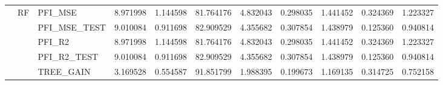 \begin{table}
\begin{tabular}{lllrrrrrrrr}
\cline{2-11}
 & \multirow[c]{8}{*}{RF} & PFI\_MSE & {\cellcolor[HTML]{5B7AE5}} \color[HTML]{F1F1F1} 8.971998 & {\cellcolor[HTML]{3D50C3}} \color[HTML]{F1F1F1} 1.144598 & {\cellcolor[HTML]{B40426}} \color[HTML]{F1F1F1} 81.764176 & {\cellcolor[HTML]{4B64D5}} \color[HTML]{F1F1F1} 4.832043 & {\cellcolor[HTML]{3B4CC0}} \color[HTML]{F1F1F1} 0.298035 & {\cellcolor[HTML]{3E51C5}} \color[HTML]{F1F1F1} 1.441452 & {\cellcolor[HTML]{3B4CC0}} \color[HTML]{F1F1F1} 0.324369 & {\cellcolor[HTML]{3D50C3}} \color[HTML]{F1F1F1} 1.223327 \\
 &  & PFI\_MSE\_TEST & {\cellcolor[HTML]{5B7AE5}} \color[HTML]{F1F1F1} 9.010084 & {\cellcolor[HTML]{3D50C3}} \color[HTML]{F1F1F1} 0.911698 & {\cellcolor[HTML]{B40426}} \color[HTML]{F1F1F1} 82.909529 & {\cellcolor[HTML]{4A63D3}} \color[HTML]{F1F1F1} 4.355682 & {\cellcolor[HTML]{3B4CC0}} \color[HTML]{F1F1F1} 0.307854 & {\cellcolor[HTML]{3F53C6}} \color[HTML]{F1F1F1} 1.438979 & {\cellcolor[HTML]{3B4CC0}} \color[HTML]{F1F1F1} 0.125360 & {\cellcolor[HTML]{3D50C3}} \color[HTML]{F1F1F1} 0.940814 \\
 &  & PFI\_R2 & {\cellcolor[HTML]{5B7AE5}} \color[HTML]{F1F1F1} 8.971998 & {\cellcolor[HTML]{3D50C3}} \color[HTML]{F1F1F1} 1.144598 & {\cellcolor[HTML]{B40426}} \color[HTML]{F1F1F1} 81.764176 & {\cellcolor[HTML]{4B64D5}} \color[HTML]{F1F1F1} 4.832043 & {\cellcolor[HTML]{3B4CC0}} \color[HTML]{F1F1F1} 0.298035 & {\cellcolor[HTML]{3E51C5}} \color[HTML]{F1F1F1} 1.441452 & {\cellcolor[HTML]{3B4CC0}} \color[HTML]{F1F1F1} 0.324369 & {\cellcolor[HTML]{3D50C3}} \color[HTML]{F1F1F1} 1.223327 \\
 &  & PFI\_R2\_TEST & {\cellcolor[HTML]{5B7AE5}} \color[HTML]{F1F1F1} 9.010084 & {\cellcolor[HTML]{3D50C3}} \color[HTML]{F1F1F1} 0.911698 & {\cellcolor[HTML]{B40426}} \color[HTML]{F1F1F1} 82.909529 & {\cellcolor[HTML]{4A63D3}} \color[HTML]{F1F1F1} 4.355682 & {\cellcolor[HTML]{3B4CC0}} \color[HTML]{F1F1F1} 0.307854 & {\cellcolor[HTML]{3F53C6}} \color[HTML]{F1F1F1} 1.438979 & {\cellcolor[HTML]{3B4CC0}} \color[HTML]{F1F1F1} 0.125360 & {\cellcolor[HTML]{3D50C3}} \color[HTML]{F1F1F1} 0.940814 \\
 &  & TREE\_GAIN & {\cellcolor[HTML]{445ACC}} \color[HTML]{F1F1F1} 3.169528 & {\cellcolor[HTML]{3B4CC0}} \color[HTML]{F1F1F1} 0.554587 & {\cellcolor[HTML]{B40426}} \color[HTML]{F1F1F1} 91.851799 & {\cellcolor[HTML]{3F53C6}} \color[HTML]{F1F1F1} 1.988395 & {\cellcolor[HTML]{3B4CC0}} \color[HTML]{F1F1F1} 0.199673 & {\cellcolor[HTML]{3D50C3}} \color[HTML]{F1F1F1} 1.169135 & {\cellcolor[HTML]{3B4CC0}} \color[HTML]{F1F1F1} 0.314725 & {\cellcolor[HTML]{3C4EC2}} \color[HTML]{F1F1F1} 0.752158 \\

\end{tabular}
\end{table}
